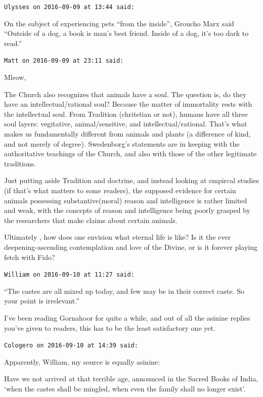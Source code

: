 \begin{footnotesize}
\begin{sffamily}
\hfill

\texttt{Ulysses on 2016-09-09 at 13:44 said: }

On the subject of experiencing pets “from the inside”, Groucho Marx said “Outside of a dog, a book is man's best friend. Inside of a dog, it's too dark to read.”


\hfill


\hfill


\hfill

\texttt{Matt on 2016-09-09 at 23:11 said: }

Mleow,

The Church also recognizes that animals have a soul. The question is, do they have an intellectual/rational soul? Because the matter of immortality rests with the intellectual soul. From Tradition (chritstian or not), humans have all three soul layers: vegitative, animal/sensitive, and intellectual/rational. That's what makes us fundamentally different from animals and plants (a difference of kind, and not merely of degree). Swedenborg's statements are in keeping with the authoritative teachings of the Church, and also with those of the other legitimate traditions.

Just putting aside Tradition and doctrine, and instead looking at empircal studies (if that's what matters to some readers), the supposed evidence for certain animals possessing substantive(moral) reason and intelligence is rather limited and weak, with the concepts of reason and intelligence being poorly grasped by the researchers that make claims about certain animals.

Ultimately , how does one envision what eternal life is like? Is it the ever deepening-ascending contemplation and love of the Divine, or is it forever playing fetch with Fido?


\hfill

\texttt{William on 2016-09-10 at 11:27 said: }

“The castes are all mixed up today, and few may be in their correct caste. So your point is irrelevant.”

I've been reading Gornahoor for quite a while, and out of all the asinine replies you've given to readers, this has to be the least satisfactory one yet.


\hfill

\texttt{Cologero on 2016-09-10 at 14:39 said: }

Apparently, William, my source is equally asinine:

\begin{quotex}
Have we not arrived at that terrible age, announced in the Sacred Books of India, `when the castes shall be mingled, when even the family shall no longer exist'.


\end{quotex}
\end{sffamily}
\end{footnotesize}
